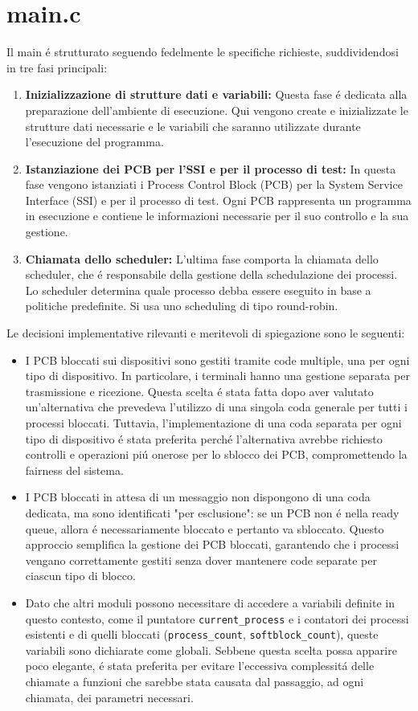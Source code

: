 \documentclass[a4paper]{article}
\begin{document}
\section{main.c}
Il main \'e strutturato seguendo fedelmente le specifiche richieste, suddividendosi in tre fasi principali:\begin{enumerate}
	\item \textbf{Inizializzazione di strutture dati e variabili:} Questa fase \'e dedicata alla preparazione dell'ambiente di esecuzione. Qui vengono create e inizializzate le strutture dati necessarie e le variabili che saranno utilizzate durante l'esecuzione del programma.
  \item \textbf{Istanziazione dei PCB per l’SSI e per il processo di test:} In questa fase vengono istanziati i Process Control Block (PCB) per la System Service Interface (SSI) e per il processo di test. Ogni PCB rappresenta un programma in esecuzione e contiene le informazioni necessarie per il suo controllo e la sua gestione.
  \item \textbf{Chiamata dello scheduler:} L'ultima fase comporta la chiamata dello scheduler, che \'e responsabile della gestione della schedulazione dei processi. Lo scheduler determina quale processo debba essere eseguito in base a politiche predefinite. Si usa uno scheduling di tipo round-robin.
\end{enumerate}
Le decisioni implementative rilevanti e meritevoli di spiegazione sono le seguenti:
\begin{itemize}  
	\item I PCB bloccati sui dispositivi sono gestiti tramite code multiple, una per ogni tipo di dispositivo. In particolare, i terminali hanno una gestione separata per trasmissione e ricezione. Questa scelta \'e stata fatta dopo aver valutato un'alternativa che prevedeva l'utilizzo di una singola coda generale per tutti i processi bloccati. Tuttavia, l'implementazione di una coda separata per ogni tipo di dispositivo \'e stata preferita perché l'alternativa avrebbe richiesto controlli e operazioni pi\'u onerose per lo sblocco dei PCB, compromettendo la fairness del sistema.
	\item I PCB bloccati in attesa di un messaggio non dispongono di una coda dedicata, ma sono identificati "per esclusione": se un PCB non \'e nella ready queue, allora \'e necessariamente bloccato e pertanto va sbloccato. Questo approccio semplifica la gestione dei PCB bloccati, garantendo che i processi vengano correttamente gestiti senza dover mantenere code separate per ciascun tipo di blocco.
	\item Dato che altri moduli possono necessitare di accedere a variabili definite in questo contesto, come il puntatore \verb+current_process+ e i contatori dei processi esistenti e di quelli bloccati (\verb+process_count+, \verb+softblock_count+), queste variabili sono dichiarate come globali. Sebbene questa scelta possa apparire poco elegante, \'e stata preferita per evitare l'eccessiva complessit\'a delle chiamate a funzioni che sarebbe stata causata dal passaggio, ad ogni chiamata, dei parametri necessari.
\end{itemize}
\end{document}
